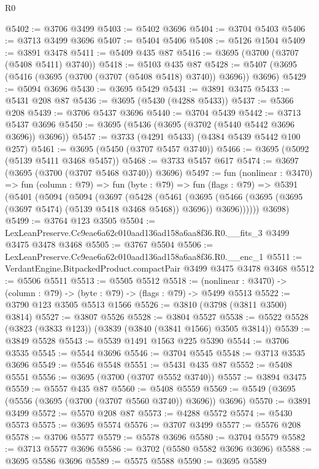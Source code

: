 \begin{lexlean}{R0}
\begin{coremodule}
@5402 := @3706 @3499
@5403 := @5402 @3696
@5404 := @3704 @5403
@5406 := @3713 @3499 @3696
@5407 := @5404 @5406
@5408 := @5126 @1504
@5409 := @3891 @3478
@5411 := @5409 @435 @87
@5416 := @3695 (@3700 (@3707 (@5408 @5411) @3740))
@5418 := @5103 @435 @87
@5428 := @5407 (@3695 (@5416 (@3695 (@3700 (@3707 (@5408 @5418) @3740)) @3696)) @3696)
@5429 := @5094 @3696
@5430 := @3695 @5429
@5431 := @3891 @3475
@5433 := @5431 @208 @87
@5436 := @3695 (@5430 (@4288 @5433))
@5437 := @5366 @208
@5439 := @3706 @5437 @3696
@5440 := @3704 @5439
@5442 := @3713 @5437 @3696
@5450 := @3695 (@5436 (@3695 (@3702 (@5440 @5442 @3696 @3696)) @3696))
@5457 := @3733 (@4291 @5433) (@4384 @5439 @5442 @100 @257)
@5461 := @3695 (@5450 (@3707 @5457 @3740))
@5466 := @3695 (@5092 (@5139 @5411 @3468 @5457))
@5468 := @3733 @5457 @617
@5474 := @3697 (@3695 (@3700 (@3707 @5468 @3740)) @3696)
@5497 := fun (nonlinear : @3470) =>
  fun (column : @79) =>
  fun (byte : @79) =>
  fun (flags : @79) =>
  @5391
    (@5401
      (@5094
        (@5094
          (@3697
            (@5428
              (@5461
                (@3695
                  (@5466 (@3695 (@3695 (@3697 @5474) (@5139 @5418 @3468 @5468)) @3696))
                  @3696))))))
      @3698)
@5499 := @3764 @123 @3505
@5504 := LexLeanPreserve.Cc9eae6a62c010aad136ad158a6aa8f36.R0.__fits_3 @3499 @3475 @3478 @3468
@5505 := @3767 @5504
@5506 := LexLeanPreserve.Cc9eae6a62c010aad136ad158a6aa8f36.R0.__enc_1
@5511 := VerdantEngine.BitpackedProduct.compactPair @3499 @3475 @3478 @3468
@5512 := @5506 @5511
@5513 := @5505 @5512
@5518 := (nonlinear : @3470) -> (column : @79) -> (byte : @79) -> (flags : @79) -> @5499 @5513
@5522 := @3790 @123 @3505 @5513 @1566
@5526 := @3810 (@3798 (@3811 @3500) @3814)
@5527 := @3807 @5526
@5528 := @3804 @5527
@5538 := @5522 @5528 (@3823 (@3833 @123)) (@3839 (@3840 (@3841 @1566) @3505 @3814))
@5539 := @3849 @5528
@5543 := @5539 @1491 @1563 @225 @5390
@5544 := @3706 @3535
@5545 := @5544 @3696
@5546 := @3704 @5545
@5548 := @3713 @3535 @3696
@5549 := @5546 @5548
@5551 := @5431 @435 @87
@5552 := @5408 @5551
@5556 := @3695 (@3700 (@3707 @5552 @3740))
@5557 := @3894 @3475
@5559 := @5557 @435 @87
@5560 := @5408 @5559
@5569 := @5549 (@3695 (@5556 (@3695 (@3700 (@3707 @5560 @3740)) @3696)) @3696)
@5570 := @3891 @3499
@5572 := @5570 @208 @87
@5573 := @4288 @5572
@5574 := @5430 @5573
@5575 := @3695 @5574
@5576 := @3707 @3499
@5577 := @5576 @208
@5578 := @3706 @5577
@5579 := @5578 @3696
@5580 := @3704 @5579
@5582 := @3713 @5577 @3696
@5586 := @3702 (@5580 @5582 @3696 @3696)
@5588 := @3695 @5586 @3696
@5589 := @5575 @5588
@5590 := @3695 @5589

\end{coremodule}
\end{lexlean}
